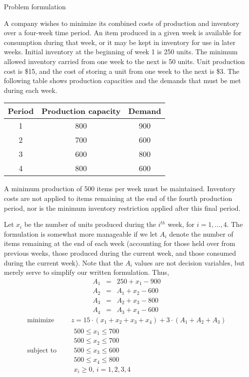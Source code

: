 \documentclass[c]{beamer}
\begin{document}
\begin{frame}[allowframebreaks]{Problem formulation}
  \begin{Exercise}
  A company wishes to minimize its combined costs of production and inventory over a four-week time period. An item produced in a given week is available for consumption during that week, or it may be kept in inventory for use in later weeks. Initial inventory at the beginning of week 1 is 250 units. The minimum allowed inventory carried from one week to the next is 50 units. Unit production cost is \$15, and the cost of storing a unit from one week to the next is \$3. The following table shows production capacities and the demands that must be met during each week.\cite{carter}
    \begin{center}
    \begin{tabular}{ccc}
      Period  & Production capacity & Demand  \\\hline
      1 &  800 &  900 \\
      2 & 700 & 600\\
      3 & 600 & 800\\
      4 & 800 & 600
    \end{tabular}
  \end{center}
  A minimum production of 500 items per week must be maintained. Inventory costs are not applied to items remaining at the end of the fourth production period, nor is the minimum inventory restriction applied after this final period.
  \end{Exercise}
  \framebreak
  Let $x_i$ be the number of units produced during the $i^{th}$ week, for $i = 1, …, 4$. The formulation is somewhat more manageable if we let $A_i$ denote the number of items remaining at the end of each week (accounting for those held over from previous weeks, those produced during the current week, and those consumed during the current week). Note that the $A_i$ values are not decision variables, but merely serve to simplify our written formulation. Thus,
  \begin{eqnarray*}
    A_1&=&250+x_1-900\\
    A_2&=&A_1+x_2-600\\
    A_3&=&A_2+x_3-800\\
    A_4&=&A_3+x_4-600
  \end{eqnarray*}
  \begin{equation*}
    \begin{aligned}
      \text{minimize } \quad & z = 15\cdot(x_1+x_2+x_3+x_4)+3\cdot (A_1+A_2+A_3) \\
      \text{subject to }\quad &
      \begin{array}{c}
        500 \leq x_1 \leq 700\\
        500 \leq x_2 \leq 700\\
        500 \leq x_3 \leq 600\\
        500 \leq x_4 \leq 800\\
        x_i \geq 0, \, i=1,2,3,4
      \end{array}
    \end{aligned}
  \end{equation*}
\end{frame}
\end{document}
